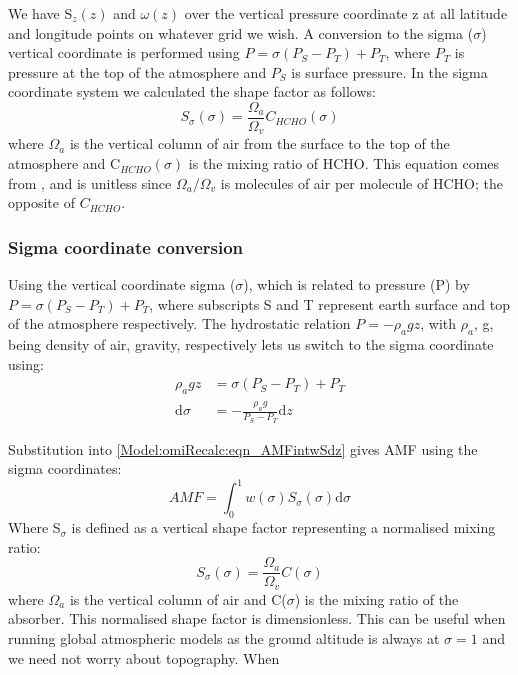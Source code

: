       
      We have S$_z(z)$ and $\omega(z)$ over the vertical pressure coordinate z at all latitude and longitude points on whatever grid we wish. 
      A conversion to the sigma ($\sigma$) vertical coordinate is performed using $ P = \sigma (P_S - P_T) + P_T$, where $P_T$ is pressure at the top of the atmosphere and $P_S$ is surface pressure.
      In the sigma coordinate system we calculated the shape factor as follows:
      \begin{equation} \label{Model:omiRecalc:eqn_ShapeFactorSigma}
      S_\sigma(\sigma) = \frac{\Omega_a}{\Omega_v}C_{HCHO}(\sigma)
      \end{equation}
      where $\Omega_a$ is the vertical column of air from the surface to the top of the atmosphere and C$_{HCHO}(\sigma)$ is the mixing ratio of HCHO.
      This equation comes from \textcite{Palmer2001}, and is unitless since $\Omega_a / \Omega_v$ is molecules of air per molecule of HCHO; the opposite of $C_{HCHO}$.
    
    \subsubsection{Sigma coordinate conversion}
      \label{Model:omiRecalc:sigmacoord}
      
      Using the vertical coordinate sigma ($\sigma$), which is related to pressure (P) by $P=\sigma \left( P_S - P_T \right) + P_T$, where subscripts S and T represent earth surface and top of the atmosphere respectively.
      The hydrostatic relation $P = - \rho_a g z$, with $\rho_a$, g, being density of air, gravity, respectively lets us switch to the sigma coordinate using:
      \begin{align*}
        \rho_a g z & = \sigma \left( P_S - P_T \right) + P_T \\
        \mathrm{d}\sigma  & = - \frac{ \rho_a g }{ P_S - P_T } \mathrm{d}z
      \end{align*}
      
      Substitution into \ref{Model:omiRecalc:eqn_AMFintwSdz} gives AMF using the sigma coordinates:
      \begin{equation} \label{Model:omiRecalc:eqn_AMFintwSdsigma}
      AMF = \int_0^1 w(\sigma) S_\sigma(\sigma) \mathrm{d}\sigma
      \end{equation}
      Where S$_\sigma$ is defined as a vertical shape factor representing a normalised mixing ratio:
      \begin{equation}
      S_\sigma (\sigma) = \frac{\Omega_a}{\Omega_v}C(\sigma)
      \end{equation}
      where $\Omega_a$ is the vertical column of air and C($\sigma$) is the mixing ratio of the absorber.
      This normalised shape factor is dimensionless.
      This can be useful when running global atmospheric models as the ground altitude is always at $\sigma=1$ and we need not worry about topography.
      When 
    
